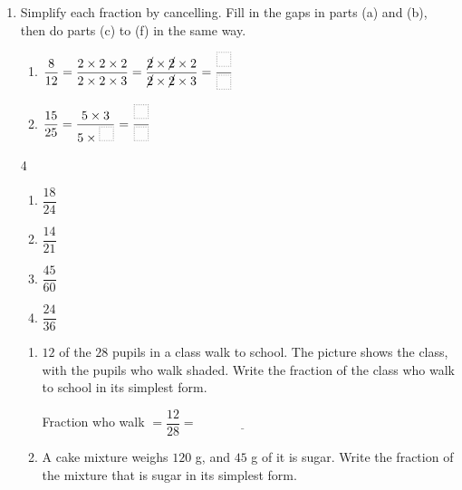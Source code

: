 \documentclass[12pt,a4paper]{article}
\newcommand{\ansline}[1][2.2cm]{\underline{\hspace{#1}}}
\newcommand{\boxgap}[1][9pt]{\tikz[baseline=-0.8pt]\draw[gray!60,densely dotted,thick]
  (0,0) rectangle (#1,#1);}
\begin{document}
\begin{enumerate}[resume]

\item Simplify each fraction by cancelling. Fill in the gaps in parts (a) and
(b), then do parts (c) to (f) in the same way.
\begin{enumerate}
  \item $\dfrac{8}{12}=\dfrac{2\times2\times2}{2\times2\times3}
         =\dfrac{\cancel{2}\times\cancel{2}\times2}
          {\cancel{2}\times\cancel{2}\times3}
         =\dfrac{\boxgap[11pt]}{\boxgap[11pt]}$
  \item $\dfrac{15}{25}=\dfrac{5\times3}{5\times\boxgap[11pt]}
         =\dfrac{\boxgap[11pt]}{\boxgap[11pt]}$
\end{enumerate}
\vspace{6pt}
\begin{multicols}{4}
\begin{enumerate}[resume]
  \item $\dfrac{18}{24}$
  \item $\dfrac{14}{21}$
  \item $\dfrac{45}{60}$
  \item $\dfrac{24}{36}$
\end{enumerate}
\end{multicols}
\vspace{6em}

\begin{enumerate}[start=7]
  \item $12$ of the $28$ pupils in a class walk to school. The picture shows
        the class, with the pupils who walk shaded. Write the fraction of the
        class who walk to school in its simplest form.

\vspace{4pt}
\begin{minipage}[t]{0.40\linewidth}
\centering
{}
\end{minipage}%
\begin{minipage}[t]{0.56\linewidth}
\vspace{0.6em}
Fraction who walk $=\dfrac{12}{28}=\ansline[3cm]$
\end{minipage}

\vspace{3em}
  \item A cake mixture weighs $120$ g, and $45$ g of it is sugar. Write the
        fraction of the mixture that is sugar in its simplest form.

\vspace{5em}
\end{enumerate}

\end{enumerate}
\end{document}
